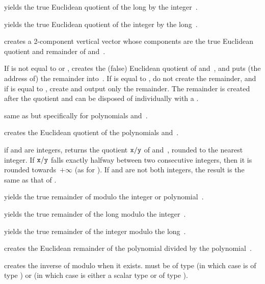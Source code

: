  yields the true Euclidean
quotient of the long  by the integer~.

 yields the true Euclidean
quotient of the integer  by the long~.

 creates a 2-component vertical
vector whose components are the true Euclidean quotient and remainder
of  and~.

 If  is not equal to
 or , creates the (false) Euclidean quotient of
 and~, and puts (the address of) the remainder into~.
If  is equal to , do not create the remainder, and if
 is equal to , create and output only the remainder.
The remainder is created after the quotient and can be disposed of
individually with a .

 same as  but
specifically for polynomials  and~.

 creates the Euclidean quotient of the
polynomials  and~.

 if  and  are integers,
returns the quotient ${\tt x}/{\tt y}$ of  and~, rounded to
the nearest integer. If ${\tt x}/{\tt y}$ falls exactly halfway between
two consecutive integers, then it is rounded towards~$+\infty$ (as for
). If  and  are not both integers, the result
is the same as that of .

 yields the true remainder of 
modulo the integer or polynomial~.

 yields the true remainder of the
long  modulo the integer~.

 yields the true remainder of the
integer  modulo the long~.

 creates the Euclidean remainder of the
polynomial  divided by the polynomial~.

 creates the inverse of  modulo 
when it exists.  must be of type  (in which case  is of type ) or  (in which case  is either a scalar type or
of type ).

